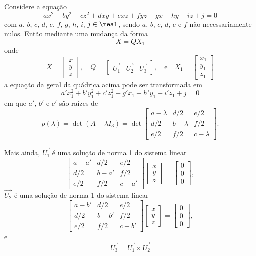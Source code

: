 \begin{teorema}
  Considere a equação
  \[
      ax^2 + by^2 + cz^2 + dxy + exz + fyz + gx + hy + iz + j = 0
  \]
  com $a$, $b$, $c$, $d$, $e$, $f$, $g$, $h$, $i$, $j \in \real$, sendo $a$, $b$, $c$, $d$, $e$ e $f$ não necessariamente nulos. Então mediante uma mudança da forma
  \[
    X = Q X_1
  \]
  onde
  \[
    X = \begin{bmatrix}
      x\\y\\z
    \end{bmatrix}, \quad
    Q = \begin{bmatrix}
    	\vec{U_1} & \vec{U_2} & \vec{U_3}
  \end{bmatrix}, \quad\mbox{e}\quad
  X_1 = \begin{bmatrix}
    x_1\\y_1\\z_1
  \end{bmatrix}
  \]
  a equação da geral da quádrica acima pode ser transformada em
  \[
    a'x_1^2 + b'y_1^2 + c'z_1^2 + g'x_1 + h'y_1 + i'z_1 + j = 0
  \]
  em que $a'$, $b'$ e $c'$ são raízes de
  \[
    p(\lambda) = \det(A - \lambda I_3) = \det \begin{bmatrix}
      a - \lambda & d/2 & e/2\\
      d/2 & b - \lambda & f/2\\
      e/2 & f/2 & c - \lambda
    \end{bmatrix}.
  \]

  Mais ainda, $\vec{U_1}$ é uma solução de norma 1 do sistema linear
  \[
    \begin{bmatrix}
      a - a' & d/2 & e/2\\
      d/2 & b - a' & f/2\\
      e/2 & f/2 & c - a'
    \end{bmatrix} \begin{bmatrix}
      x\\y\\z
    \end{bmatrix} = \begin{bmatrix}
      0\\0\\0
    \end{bmatrix},
  \]
  $\vec{U_2}$ é uma solução de norma 1 do sistema linear
  \[
    \begin{bmatrix}
      a - b' & d/2 & e/2\\
      d/2 & b - b' & f/2\\
      e/2 & f/2 & c - b'
    \end{bmatrix} \begin{bmatrix}
      x\\y\\z
    \end{bmatrix} = \begin{bmatrix}
      0\\0\\0
    \end{bmatrix},
  \]
  e
  \[
  	\vec{U_3} = \vec{U_1} \times \vec{U_2}
  \]
\end{teorema}

